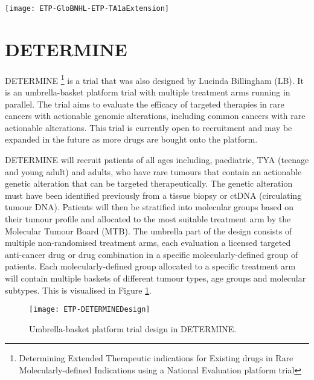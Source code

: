 \begin{sidewaysfigure}[h!]
	\centering
	\caption{ETP for the expansion stage of treatment arm \RN{1}a in Glo-BNHL.}
	\label{fig_etp:GloBNHL-ETP-TA1aExtenstion}
	\texttt{[image: ETP-GloBNHL-ETP-TA1aExtension]}
\end{sidewaysfigure} 

\clearpage


\section{DETERMINE}

DETERMINE \footnote{Determining Extended Therapeutic indications for Existing drugs in Rare Molecularly-defined Indications using a National Evaluation platform trial} is a trial that was also designed by Lucinda Billingham (LB). It is an umbrella-basket platform trial with multiple treatment arms running in parallel. The trial aims to evaluate the efficacy of targeted therapies in rare cancers with actionable genomic alterations, including common cancers with rare actionable alterations. This trial is currently open to recruitment and may be expanded in the future as more drugs are bought onto the platform.  

DETERMINE will recruit patients of all ages including, paediatric, TYA (teenage and young adult) and adults, who have rare tumours that contain an actionable genetic alteration that can be targeted therapeutically. The genetic alteration must have been identified previously from a tissue biopsy or ctDNA (circulating tumour DNA). Patients will then be stratified into molecular groups based on their tumour profile and allocated to the most suitable treatment arm by the Molecular Tumour Board (MTB). The umbrella part of the design consists of multiple non-randomised treatment arms, each evaluation a licensed targeted anti-cancer drug or drug combination in a specific molecularly-defined group of patients. Each molecularly-defined group allocated to a specific treatment arm will contain multiple baskets of different tumour types, age groups and molecular subtypes. This is visualised in Figure \ref{fig_etp:DETERMINEDesign}. 

\begin{figure}[h!]
	\centering
	\caption{Umbrella-basket platform trial design in DETERMINE.}
	\label{fig_etp:DETERMINEDesign}
	\texttt{[image: ETP-DETERMINEDesign]}
\end{figure}

